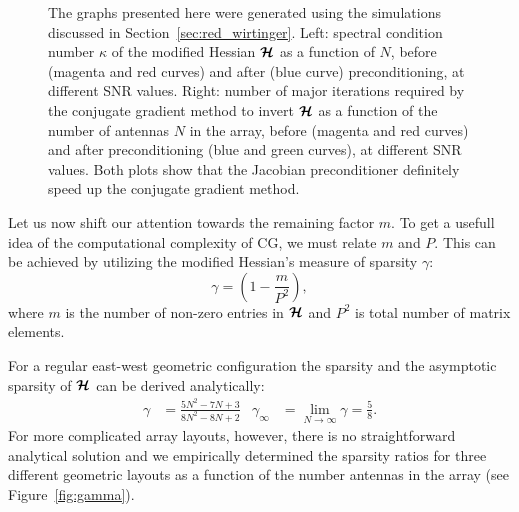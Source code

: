 \documentclass[useAMS,usenatbib]{mn2e}
\newcommand{\bmH}{\bmath{\mathcal{H}}}
\begin{document}
\begin{figure}
\centering
{}
\caption{The graphs presented here were generated using the simulations discussed in Section~\ref{sec:red_wirtinger}. Left: spectral condition number $\kappa$ of the modified Hessian $\bmH$ as a function of $N$, before (magenta and red curves) and after (blue curve) preconditioning, at different SNR values. Right: number of major iterations required by the conjugate 
gradient method to invert $\bmH$ as a function of the number of antennas $N$ in the array, before (magenta and red curves) and after preconditioning (blue and green curves), at different SNR values. Both plots show that the Jacobian preconditioner definitely speed up the conjugate gradient method. \label{fig:kappa_itr}} 
\end{figure}


Let us now shift our attention towards the remaining factor $m$. To get a usefull idea of the computational complexity of CG, we must relate $m$ and $P$. This can be achieved by utilizing the modified Hessian's measure of sparsity $\gamma$:   
\begin{equation}
 \gamma = \left (1 - \frac{m}{P^2} \right ),
\end{equation}
where $m$ is the number of non-zero entries in $\bmH$  and $P^2$ is total number of matrix elements.

For a regular east-west geometric configuration the sparsity and the asymptotic sparsity of $\bmH$ can be derived analytically:
\begin{align}
\gamma &= \frac{5N^2-7N+3}{8N^2-8N+2} & \gamma_{\infty} &= \lim_{N\rightarrow \infty}\gamma = \frac{5}{8} \label{eq:gamma}. 
\end{align}
For more complicated array layouts, however, there is no straightforward analytical solution and we empirically determined the sparsity ratios for three different geometric layouts as a function of the number antennas in the array (see Figure~\ref{fig:gamma}). 
\end{document}
